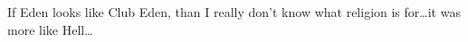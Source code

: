 \begin{post}
	\begin{content}
\begin{blockquote}If Eden looks like Club Eden, than I really don't know what religion is for{\ldots}it was more like Hell{\ldots}\end{blockquote}
	\end{content}
\end{post}
